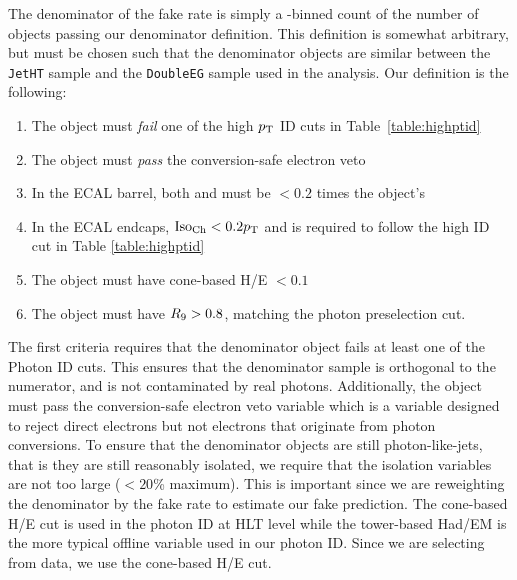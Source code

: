 The denominator of the fake rate is simply a \pt-binned count of the number of objects passing our denominator definition. This definition is somewhat arbitrary, but must be chosen such that the denominator objects are similar between the \texttt{JetHT} sample and the \texttt{DoubleEG} sample used in the analysis. Our definition is the following:
\begin{enumerate}
\item The object must \emph{fail} one of the high $p_{\mathrm{T}}$ ID cuts in Table~\ref{table:highptid}
\item The object must \emph{pass} the conversion-safe electron veto
\item In the ECAL barrel, both \chiso and \corphoiso must be $< 0.2$ times the object's \pt
\item In the ECAL endcaps, $\text{Iso}_{\text{Ch}}<0.2p_{\mathrm{T}}$ and \corphoiso is required to follow the high \pt ID cut in Table \ref{table:highptid}
\item The object must have cone-based H/E $< 0.1$ 
\item The object must have $R_\mathrm{9}>0.8$, matching the photon preselection cut.
\end{enumerate} \label{denom_definition}

The first criteria requires that the denominator object fails at least one of the Photon ID cuts. This ensures that the denominator sample is orthogonal to the numerator, and is not contaminated by real photons. Additionally, the object must pass the conversion-safe electron veto variable which is a variable designed to reject direct electrons but not electrons that originate from photon conversions. To ensure that the denominator objects are still photon-like-jets, that is they are still reasonably isolated, we require that the isolation variables are not too large ($<20$\% maximum). This is important since we are reweighting the denominator by the fake rate to estimate our fake prediction. The cone-based H/E cut is used in the photon ID at HLT level while the tower-based Had/EM is the more typical offline variable used in our photon ID. Since we are selecting from data, we use the cone-based H/E cut. 


